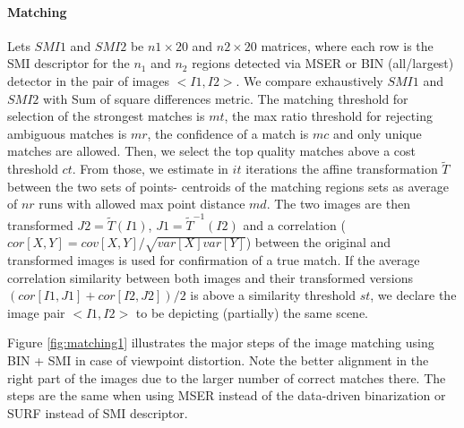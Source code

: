 \documentclass[a4paper,11pt]{article}
\begin{document}
\paragraph{Matching}

Lets $SMI1$ and $SMI2$ be $n1 \times 20$ and $n2 \times 20$ matrices, where each row is the SMI descriptor for the $n_1$ and $n_2$ regions detected via MSER or BIN (all/largest) detector in the pair of images $<I1, I2>$.
We compare exhaustively  $SMI1$ and $SMI2$ with Sum of square differences metric. The matching threshold for selection of the strongest matches is $mt$, the max ratio threshold for rejecting ambiguous matches is $mr$, the confidence of a match is $mc$ and only unique matches are allowed. Then, we select the top quality matches above a cost threshold $ct$. From those, we estimate in $it$ iterations the affine transformation ${\tilde T}$ between the two sets of points- centroids of the matching regions sets as average of $nr$ runs with allowed max point distance $md$. The two images are then transformed $J2 = {\tilde T}(I1)$, $J1 = {\tilde T}^{-1}(I2)$ and a correlation ($cor[X,Y] = cov[X,Y]/ \sqrt{var[X] var[Y]}$) between the original and transformed images is used for confirmation of a true match. If the average correlation similarity between both images and their transformed versions $(cor[I1, J1]+cor[I2, J2])/2$ is above a similarity threshold $st$, we declare the image pair $<I1, I2>$ to be depicting (partially) the same scene.

Figure \ref{fig:matching1} illustrates the major steps of the image matching using BIN + SMI in case of viewpoint distortion. Note the better alignment in the right part of the images due to the larger number of correct matches there. The steps are the same when using MSER instead of the data-driven binarization or SURF instead of SMI descriptor.
\end{document}
